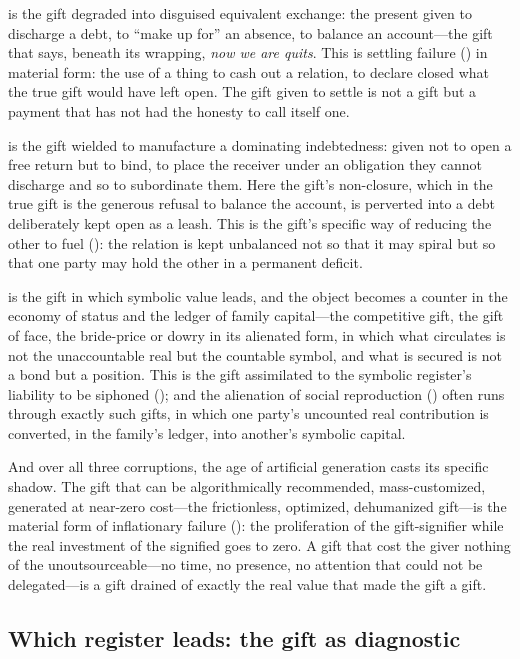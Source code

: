  is the gift degraded into disguised equivalent exchange: the present given to discharge a debt, to ``make up for'' an absence, to balance an account---the gift that says, beneath its wrapping, \emph{now we are quits}. This is settling failure () in material form: the use of a thing to cash out a relation, to declare closed what the true gift would have left open. The gift given to settle is not a gift but a payment that has not had the honesty to call itself one.

 is the gift wielded to manufacture a dominating indebtedness: given not to open a free return but to bind, to place the receiver under an obligation they cannot discharge and so to subordinate them. Here the gift's non-closure, which in the true gift is the generous refusal to balance the account, is perverted into a debt deliberately kept open as a leash. This is the gift's specific way of reducing the other to fuel (): the relation is kept unbalanced not so that it may spiral but so that one party may hold the other in a permanent deficit.

 is the gift in which symbolic value leads, and the object becomes a counter in the economy of status and the ledger of family capital---the competitive gift, the gift of face, the bride-price or dowry in its alienated form, in which what circulates is not the unaccountable real but the countable symbol, and what is secured is not a bond but a position. This is the gift assimilated to the symbolic register's liability to be siphoned (); and the alienation of social reproduction () often runs through exactly such gifts, in which one party's uncounted real contribution is converted, in the family's ledger, into another's symbolic capital.

And over all three corruptions, the age of artificial generation casts its specific shadow. The gift that can be algorithmically recommended, mass-customized, generated at near-zero cost---the frictionless, optimized, dehumanized gift---is the material form of inflationary failure (): the proliferation of the gift-signifier while the real investment of the signified goes to zero. A gift that cost the giver nothing of the unoutsourceable---no time, no presence, no attention that could not be delegated---is a gift drained of exactly the real value that made the gift a gift.

\subsection{Which register leads: the gift as diagnostic}
\label{p09:sec:gift-diagnostic}

